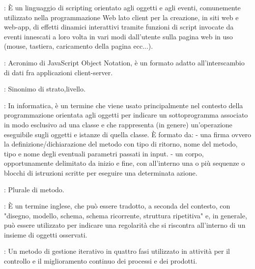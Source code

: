 {		: È un linguaggio di scripting orientato agli oggetti e agli eventi, comunemente utilizzato nella programmazione Web lato client per la creazione, in siti web e web-app, di effetti dinamici interattivi tramite funzioni di script invocate da eventi innescati a loro volta in vari modi dall'utente sulla pagina web in uso (mouse, tastiera, caricamento della pagina ecc...).
	
		: Acronimo di JavaScript Object Notation, è un formato adatto all'interscambio di dati fra applicazioni client-server.
	
	
		: Sinonimo di strato,livello.
	
	
		: In informatica, è un termine che viene usato principalmente nel contesto della programmazione orientata agli oggetti per indicare un sottoprogramma associato in modo esclusivo ad una classe e che rappresenta (in genere) un'operazione eseguibile sugli oggetti e istanze di quella classe. È formato da:
- una firma ovvero la definizione/dichiarazione del metodo con tipo di ritorno, nome del metodo, tipo e nome degli eventuali parametri passati in input.
- un corpo, opportunamente delimitato da inizio e fine, con all'interno una o più sequenze o blocchi di istruzioni scritte per eseguire una determinata azione.

		: Plurale di metodo.
		

		: È un termine inglese, che può essere tradotto, a seconda del contesto, con "disegno, modello, schema, schema ricorrente, struttura ripetitiva" e, in generale, può essere utilizzato per indicare una regolarità che si riscontra all'interno di un insieme di oggetti osservati.
		
		: Un metodo di gestione iterativo in quattro fasi utilizzato in attività per il controllo e il miglioramento continuo dei processi e dei prodotti.
		
}
